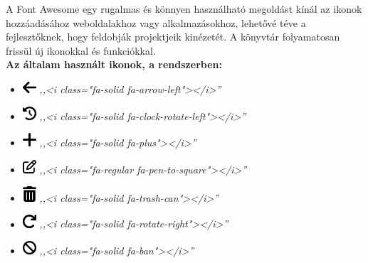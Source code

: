 \documentclass[
]{thesis-ekf}
\theoremstyle{definition}
\theoremstyle{remark}
\begin{document}
	A Font Awesome egy rugalmas és könnyen használható megoldást kínál az ikonok hozzáadásához weboldalakhoz vagy alkalmazásokhoz, lehetővé téve a fejlesztőknek, hogy feldobják projektjeik kinézetét. A könyvtár folyamatosan frissül új ikonokkal és funkciókkal.\cite{fontawesome}\\
	\textbf{Az általam használt ikonok, a rendszerben:}
	\begin{itemize}
		\item \includegraphics[width=0.5cm]{./src/icons/arrow-left-solid}
		 	\emph{,,<i class="fa-solid fa-arrow-left"></i>''}
		
		\item \includegraphics[width=0.5cm]{./src/icons/clock-rotate-left-solid} 
			\emph{,,<i class="fa-solid fa-clock-rotate-left"></i>''}
			
		\item \includegraphics[width=0.5cm]{./src/icons/plus-solid} 
			\emph{,,<i class="fa-solid fa-plus"></i>''}
		
		\item \includegraphics[width=0.5cm]{./src/icons/pen-to-square-regular}
			\emph{,,<i class="fa-regular fa-pen-to-square"></i>''}
			
		\item \includegraphics[width=0.5cm]{./src/icons/trash-can-solid}
			\emph{,,<i class="fa-solid fa-trash-can"></i>''}
			
		\item \includegraphics[width=0.5cm]{./src/icons/arrow-rotate-right-solid}
			\emph{,,<i class="fa-solid fa-rotate-right"></i>''}
		
		\item \includegraphics[width=0.5cm]{./src/icons/ban-solid}
		 	\emph{,,<i class="fa-solid fa-ban"></i>''}
			

\end{itemize}
\end{document}
